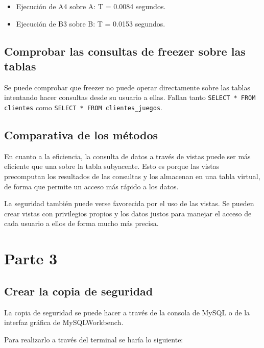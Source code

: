 \documentclass[a4paper, 11pt, oneside]{article} %
\begin{document}
\begin{itemize}
	\item Ejecución de A4 sobre A: T = 0.0084 segundos.
	\item Ejecución de B3 sobre B: T = 0.0153 segundos.
\end{itemize}

\subsection{Comprobar las consultas de freezer sobre las tablas}

Se puede comprobar que freezer no puede operar directamente sobre las tablas intentando hacer consultas desde su usuario a ellas. Fallan tanto \texttt{SELECT * FROM clientes} como \texttt{SELECT * FROM clientes_juegos}.

\subsection{Comparativa de los métodos}

En cuanto a la eficiencia, la consulta de datos a través de vistas puede ser más eficiente que una sobre la tabla subyacente. Esto es porque las vistas precomputan los resultados de las consultas y los almacenan en una tabla virtual, de forma que permite un acceso más rápido a los datos.

La seguridad también puede verse favorecida por el uso de las vistas. Se pueden crear vistas con privilegios propios y los datos justos para manejar el acceso de cada usuario a ellos de forma mucho más precisa.


\section{Parte 3}

\subsection{Crear la copia de seguridad}

La copia de seguridad se puede hacer a través de la consola de MySQL o de la interfaz gráfica de MySQLWorkbench.

Para realizarlo a través del terminal se haría lo siguiente:

\end{document}
